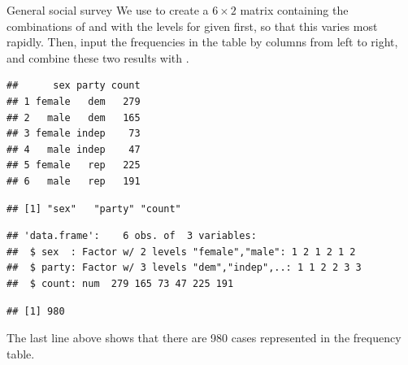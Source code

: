 \documentclass[11pt]{book}
\renewenvironment{knitrout}{\small\renewcommand{\baselinestretch}{.85}}{} %
\begin{document}
\begin{Example}[ch2-GSS]{General social survey}
We use  to create a $6 \times 2$ matrix
containing the combinations of  and  
with the levels for  given first, so that this varies
most rapidly. Then,
input the frequencies in the table by columns from
left to right, and combine these two results with
.
\begin{knitrout}
\color{fgcolor}\begin{kframe}
\begin{alltt}
 \hlkwb{<-} \hlstd{(}
  \hlstd{(}\hlstd{=}\hlstd{(}\hlstd{,} \hlstd{),}
              \hlstd{=}\hlstd{(}\hlstd{,} \hlstd{,} \hlstd{)),}
  \hlstd{=}\hlstd{(}\hlstd{,}\hlstd{,}\hlstd{,}\hlstd{,}\hlstd{,}\hlstd{))}
\end{alltt}
\begin{verbatim}
##      sex party count
## 1 female   dem   279
## 2   male   dem   165
## 3 female indep    73
## 4   male indep    47
## 5 female   rep   225
## 6   male   rep   191
\end{verbatim}
\begin{alltt}
\end{alltt}
\begin{verbatim}
## [1] "sex"   "party" "count"
\end{verbatim}
\begin{alltt}
\end{alltt}
\begin{verbatim}
## 'data.frame':	6 obs. of  3 variables:
##  $ sex  : Factor w/ 2 levels "female","male": 1 2 1 2 1 2
##  $ party: Factor w/ 3 levels "dem","indep",..: 1 1 2 2 3 3
##  $ count: num  279 165 73 47 225 191
\end{verbatim}
\begin{alltt}
\hlopt{$}
\end{alltt}
\begin{verbatim}
## [1] 980
\end{verbatim}
\end{kframe}
\end{knitrout}
The last line above shows that there are 980
cases represented in the frequency table.
\end{Example}
\end{document}
